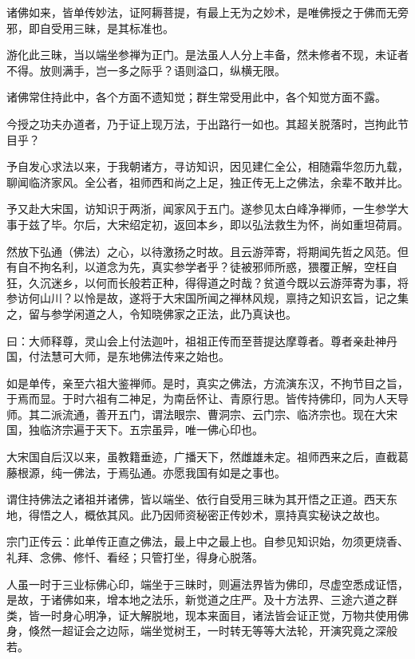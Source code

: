 




诸佛如来，皆单传妙法，证阿耨菩提，有最上无为之妙术，是唯佛授之于佛而无旁邪，即自受用三昧，是其标准也。

游化此三昧，当以端坐参禅为正门。是法虽人人分上丰备，然未修者不现，未证者不得。放则满手，岂一多之际乎？语则溢口，纵横无限。

诸佛常住持此中，各个方面不遗知觉；群生常受用此中，各个知觉方面不露。

今授之功夫办道者，乃于证上现万法，于出路行一如也。其超关脱落时，岂拘此节目乎？

予自发心求法以来，于我朝诸方，寻访知识，因见建仁全公，相随霜华忽历九载，聊闻临济家风。全公者，祖师西和尚之上足，独正传无上之佛法，余辈不敢并比。

予又赴大宋国，访知识于两浙，闻家风于五门。遂参见太白峰净禅师，一生参学大事于兹了毕。尔后，大宋绍定初，返回本乡，即以弘法救生为怀，尚如重坦荷肩。

然放下弘通（佛法）之心，以待激扬之时故。且云游萍寄，将期闻先哲之风范。但有自不拘名利，以道念为先，真实参学者乎？徒被邪师所惑，猥覆正解，空枉自狂，久沉迷乡，以何而长般若正种，得得道之时哉？贫道今既以云游萍寄为事，将参访何山川？以怜是故，遂将于大宋国所闻之禅林风规，禀持之知识玄旨，记之集之，留与参学闲道之人，令知晓佛家之正法，此乃真诀也。

曰：大师释尊，灵山会上付法迦叶，祖祖正传而至菩提达摩尊者。尊者亲赴神丹国，付法慧可大师，是东地佛法传来之始也。

如是单传，亲至六祖大鉴禅师。是时，真实之佛法，方流演东汉，不拘节目之旨，于焉而显。于时六祖有二神足，为南岳怀让、青原行思。皆传持佛印，同为人天导师。其二派流通，善开五门，谓法眼宗、曹洞宗、云门宗、临济宗也。现在大宋国，独临济宗遍于天下。五宗虽异，唯一佛心印也。

大宋国自后汉以来，虽教籍垂迹，广播天下，然雌雄未定。祖师西来之后，直截葛藤根源，纯一佛法，于焉弘通。亦愿我国有如是之事也。

谓住持佛法之诸祖并诸佛，皆以端坐、依行自受用三昧为其开悟之正道。西天东地，得悟之人，概依其风。此乃因师资秘密正传妙术，禀持真实秘诀之故也。

宗门正传云：此单传正直之佛法，最上中之最上也。自参见知识始，勿须更烧香、礼拜、念佛、修忏、看经；只管打坐，得身心脱落。

人虽一时于三业标佛心印，端坐于三昧时，则遍法界皆为佛印，尽虚空悉成证悟，是故，于诸佛如来，增本地之法乐，新觉道之庄严。及十方法界、三途六道之群类，皆一时身心明净，证大解脱地，现本来面目，诸法皆会证正觉，万物共使用佛身，倏然一超证会之边际，端坐觉树王，一时转无等等大法轮，开演究竟之深般若。